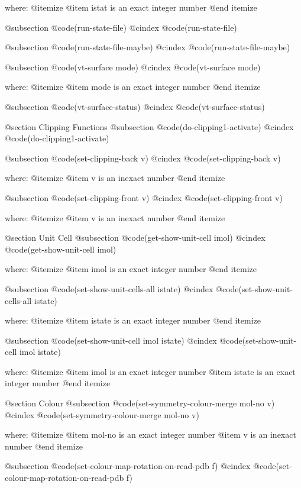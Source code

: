 where: 
 @itemize 
     @item istat is an exact integer number
 @end itemize


@subsection @code{(run-state-file)}
@cindex @code{(run-state-file)}
 
@subsection @code{(run-state-file-maybe)}
@cindex @code{(run-state-file-maybe)}
 
@subsection @code{(vt-surface mode)}
@cindex @code{(vt-surface mode)}
 
where: 
 @itemize 
     @item mode is an exact integer number
 @end itemize


@subsection @code{(vt-surface-status)}
@cindex @code{(vt-surface-status)}
 

@section Clipping Functions 
@subsection @code{(do-clipping1-activate)}
@cindex @code{(do-clipping1-activate)}
 
@subsection @code{(set-clipping-back v)}
@cindex @code{(set-clipping-back v)}
 
where: 
 @itemize 
     @item v is an inexact number
 @end itemize


@subsection @code{(set-clipping-front v)}
@cindex @code{(set-clipping-front v)}
 
where: 
 @itemize 
     @item v is an inexact number
 @end itemize



@section Unit Cell 
@subsection @code{(get-show-unit-cell imol)}
@cindex @code{(get-show-unit-cell imol)}
 
where: 
 @itemize 
     @item imol is an exact integer number
 @end itemize


@subsection @code{(set-show-unit-cells-all istate)}
@cindex @code{(set-show-unit-cells-all istate)}
 
where: 
 @itemize 
     @item istate is an exact integer number
 @end itemize


@subsection @code{(set-show-unit-cell imol istate)}
@cindex @code{(set-show-unit-cell imol istate)}
 
where: 
 @itemize 
     @item imol is an exact integer number
     @item istate is an exact integer number
 @end itemize



@section Colour 
@subsection @code{(set-symmetry-colour-merge mol-no v)}
@cindex @code{(set-symmetry-colour-merge mol-no v)}
 
where: 
 @itemize 
     @item mol-no is an exact integer number
     @item v is an inexact number
 @end itemize


@subsection @code{(set-colour-map-rotation-on-read-pdb f)}
@cindex @code{(set-colour-map-rotation-on-read-pdb f)}
 
